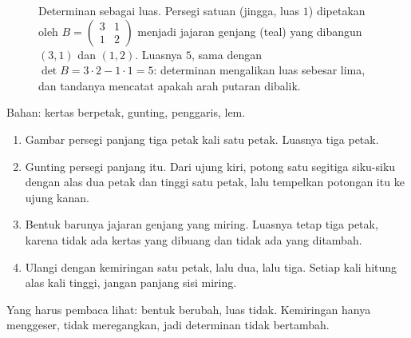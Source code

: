 \begin{figure}[htbp]
\centering
{}
\caption{Determinan sebagai luas. Persegi satuan (jingga, luas $1$) dipetakan oleh
$B=\begin{pmatrix}3&1\\ 1&2\end{pmatrix}$ menjadi jajaran genjang (teal) yang dibangun
$(3,1)$ dan $(1,2)$. Luasnya $5$, sama dengan $\det B=3\cdot2-1\cdot1=5$: determinan
mengalikan luas sebesar lima, dan tandanya mencatat apakah arah putaran dibalik.}
\label{fig:luas-determinan}
\end{figure}

\begin{tangan}
Bahan: kertas berpetak, gunting, penggaris, lem.
\begin{enumerate}
  \item Gambar persegi panjang tiga petak kali satu petak. Luasnya tiga petak.
  \item Gunting persegi panjang itu. Dari ujung kiri, potong satu segitiga siku-siku dengan alas
        dua petak dan tinggi satu petak, lalu tempelkan potongan itu ke ujung kanan.
  \item Bentuk barunya jajaran genjang yang miring. Luasnya tetap tiga petak, karena tidak
        ada kertas yang dibuang dan tidak ada yang ditambah.
  \item Ulangi dengan kemiringan satu petak, lalu dua, lalu tiga. Setiap kali hitung alas
        kali tinggi, jangan panjang sisi miring.
\end{enumerate}
Yang harus pembaca lihat: bentuk berubah, luas tidak. Kemiringan hanya menggeser, tidak
meregangkan, jadi determinan tidak bertambah.
\end{tangan}

